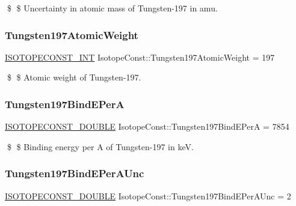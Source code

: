 \$ \$ Uncertainty in atomic mass of Tungsten-\/197 in amu. \mbox{\label{group___isotope_const-_tungsten-_w197_ga13c8249bb3c0f9a757afb3a82cd3687f}} 
\subsubsection{\texorpdfstring{Tungsten197\+Atomic\+Weight}{Tungsten197AtomicWeight}}
{\footnotesize\ttfamily \mbox{\hyperlink{group___isotope_const-_macros_ga5f18360b3e99483a35c32d789e62621c}{I\+S\+O\+T\+O\+P\+E\+C\+O\+N\+S\+T\+\_\+\+I\+NT}} Isotope\+Const\+::\+Tungsten197\+Atomic\+Weight = 197}

\$ \$ Atomic weight of Tungsten-\/197. \mbox{\label{group___isotope_const-_tungsten-_w197_ga8b51c96e8a86a12a2f30b1a4ccdd4243}} 
\subsubsection{\texorpdfstring{Tungsten197\+Bind\+E\+PerA}{Tungsten197BindEPerA}}
{\footnotesize\ttfamily \mbox{\hyperlink{group___isotope_const-_macros_ga8f45a7272ce02c0b4c65c44636ed719a}{I\+S\+O\+T\+O\+P\+E\+C\+O\+N\+S\+T\+\_\+\+D\+O\+U\+B\+LE}} Isotope\+Const\+::\+Tungsten197\+Bind\+E\+PerA = 7854}

\$ \$ Binding energy per A of Tungsten-\/197 in keV. \mbox{\label{group___isotope_const-_tungsten-_w197_ga6599817b6cd6f156e426e1f6d7efd157}} 
\subsubsection{\texorpdfstring{Tungsten197\+Bind\+E\+Per\+A\+Unc}{Tungsten197BindEPerAUnc}}
{\footnotesize\ttfamily \mbox{\hyperlink{group___isotope_const-_macros_ga8f45a7272ce02c0b4c65c44636ed719a}{I\+S\+O\+T\+O\+P\+E\+C\+O\+N\+S\+T\+\_\+\+D\+O\+U\+B\+LE}} Isotope\+Const\+::\+Tungsten197\+Bind\+E\+Per\+A\+Unc = 2}

